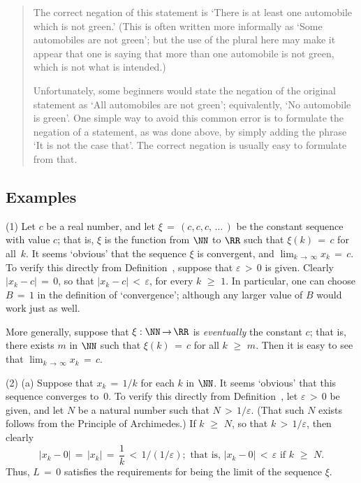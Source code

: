 \begin{quotation}
{        The correct negation of this statement is `There is at least one automobile which is not green.' (This is often written more informally as `Some automobiles are not green';
    but the use of the plural here may make it appear that one is saying that more than one automobile is not green, which is not what is intended.)

        Unfortunately, some beginners would state the negation of the original statement as `All automobiles are not green';
    equivalently, `No automobile is green'. One simple way to avoid this common error is to formulate the negation of a statement,
    as was done above, by simply adding the phrase `It is not the case that'. The correct negation is usually easy to formulate from that.
}%
\end{quotation}


\VV

            \subsection{\small{\bf Examples}}
            \label{ExampC10.20}

\V

\hspace*{\parindent}(1) Let $c$ be a real number, and let ${\xi} \,=\, (c,c,c,\,{\ldots}\,)$ be the constant sequence with value $c$; that is, ${\xi}$ is the function from ${\NN}$ to ${\RR}$ such that ${\xi}(k) \,=\, c$ for all~$k$.
    It seems `obvious' that the sequence ${\xi}$ is convergent, and $\lim_{k \,{\rightarrow}\, {\infty}} x_{k} \,=\, c$.
    To verify this directly from Definition~, suppose that ${\varepsilon}\,>\,0$ is given.
    Clearly $|x_{k}-c| \,=\, 0$, so that $|x_{k}-c|\,<\,{\varepsilon}$, for every $k\,\,{\geq}\,\,1$. In particular,
    one can choose $B \,=\, 1$ in the definition of  `convergence'; although any larger value of $B$ would work just as well.

        More generally, suppose that ${\xi}:{\NN} \,{\rightarrow}\, {\RR}$ is {\em eventually} the constant $c$;
    that is, there exists $m$ in ${\NN}$ such that ${\xi}(k) \,=\, c$ for all $k\,\,{\geq}\,\,m$.
    Then it is easy to see that $\lim_{k \,{\rightarrow}\, {\infty}} x_{k} \,=\, c$.

\V

        (2) (a) Suppose that $x_{k} \,=\, 1/k$ for each $k$ in ${\NN}$. It seems `obvious' that this sequence converges to~$0$.
    To verify this directly from Definition~, let ${\varepsilon}\,>\,0$ be given,
    and let $N$ be a natural number such that $N\,>\,1/{\varepsilon}$. (That such $N$ exists follows from the Principle of Archimedes.)
    If $k\,\,{\geq}\,\,N$, so that $k\,>\,1/{\varepsilon}$, then clearly
        \begin{displaymath}
        |x_{k} - 0| \,=\, |x_{k}| \,=\, \frac{1}{k}\,<\,1/(1/{\varepsilon}); \mbox{ that is, }
        |x_{k}-0|\,<\,{\varepsilon} \mbox{ if $k\,\,{\geq}\,\,N$}.
        \end{displaymath}
    Thus, $L \,=\, 0$ satisfies the requirements for being the limit of the sequence ${\xi}$.

